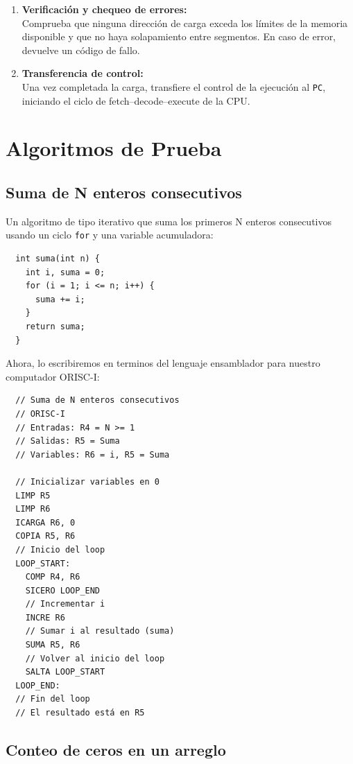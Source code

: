 \documentclass{article}
\begin{document}
\begin{enumerate}
  \item \textbf{Verificación y chequeo de errores:}\\
        Comprueba que ninguna dirección de carga exceda los límites de la memoria disponible y que no haya solapamiento entre segmentos. En caso de error, devuelve un código de fallo.

  \item \textbf{Transferencia de control:}\\
        Una vez completada la carga, transfiere el control de la ejecución al \texttt{PC}, iniciando el ciclo de fetch–decode–execute de la CPU.
\end{enumerate}


\section{Algoritmos de Prueba}

\subsection{Suma de N enteros consecutivos}

Un algoritmo de tipo iterativo que suma los primeros N enteros
consecutivos usando un ciclo \texttt{for} y una variable acumuladora:

\begin{verbatim}
  int suma(int n) {
    int i, suma = 0;
    for (i = 1; i <= n; i++) {
      suma += i;
    }
    return suma;
  }
\end{verbatim}

Ahora, lo escribiremos en terminos del lenguaje ensamblador para nuestro computador ORISC-I:

\begin{verbatim}
  // Suma de N enteros consecutivos
  // ORISC-I
  // Entradas: R4 = N >= 1
  // Salidas: R5 = Suma
  // Variables: R6 = i, R5 = Suma

  // Inicializar variables en 0
  LIMP R5
  LIMP R6
  ICARGA R6, 0
  COPIA R5, R6
  // Inicio del loop
  LOOP_START:
    COMP R4, R6
    SICERO LOOP_END
    // Incrementar i
    INCRE R6
    // Sumar i al resultado (suma)
    SUMA R5, R6
    // Volver al inicio del loop
    SALTA LOOP_START
  LOOP_END:
  // Fin del loop
  // El resultado está en R5
\end{verbatim}

\subsection{Conteo de ceros en un arreglo}
\end{document}
